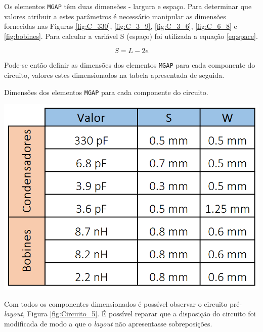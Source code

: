 \documentclass[11pt]{article}
\numberwithin{equation}{section}
\begin{document}
Os elementos \texttt{MGAP} têm duas dimensões - largura e espaço. Para determinar que valores atribuir a estes parâmetros é necessário manipular as dimensões fornecidas nas Figuras \ref{fig:C_330}, \ref{fig:C_3_9}, \ref{fig:C_3_6}, \ref{fig:C_6_8} e \ref{fig:bobines}. Para calcular a variável S (espaço) foi utilizada a equação \ref{eq:space}.

\vspace{-3mm}
\begin{equation}
S=L-2e
\label{eq:space}
\end{equation}

\vspace{1mm}
Pode-se então definir as dimensões dos elementos \texttt{MGAP} para cada componente do circuito, valores estes dimensionados na tabela apresentada de seguida. 

\begin{table}[H]
	\centering
	\caption{Dimensões dos elementos \texttt{MGAP} para cada componente do circuito.}
	\vspace{-1.5mm}
	\includegraphics[keepaspectratio=true, scale=0.40]{teoricas/aSS}
\end{table}

Com todos os componentes dimensionados é possível observar o circuito pré-\textit{layout}, Figura \ref{fig:Circuito_5}. É possível reparar que a disposição do circuito foi modificada de modo a que o \textit{layout} não apresentasse sobreposições.
\end{document}
